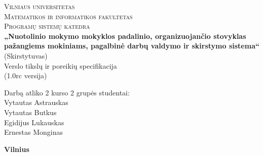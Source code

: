 \begin{titlepage}

  \begin{center}

    \textsc{\Large Vilniaus universitetas\\
    Matematikos ir informatikos fakultetas\\
    Programų sistemų katedra}\\[6.0cm]

    \textbf{ \LARGE „Nuotolinio mokymo mokyklos padalinio, 
    organizuojančio stovyklas pažangiems mokiniams, pagalbinė darbų 
    valdymo ir skirstymo sistema“ }\\
    { \Large (Skirstytuvas)}\\[0.5cm]

    {\Large Verslo tikslų ir poreikių specifikacija }\\[0.5cm]

    {\Large (1.0rc versija)}\\[3.0cm]

    \begin{minipage}[]{0.8\textwidth}
      \begin{flushright} 
        Darbą atliko 2 kurso 2 grupės studentai: \\
        Vytautas Astrauskas \\
        Vytautas Butkus \\
        Egidijus Lukauskas \\
        Ernestas Monginas
      \end{flushright}
    \end{minipage}

    \vfill

    \textbf{\large  Vilnius \\ \the\year }
  \end{center}
  
\end{titlepage}
